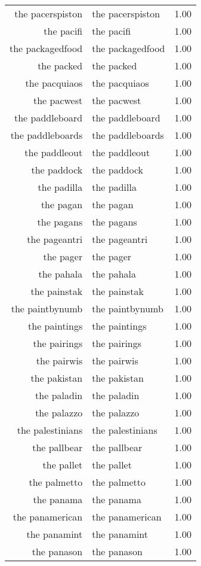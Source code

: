 \begin{table}[ht]
\begin{tabular}{rlr}
  the pacerspiston & the pacerspiston & 1.00 \\ 
  the pacifi & the pacifi & 1.00 \\ 
  the packagedfood & the packagedfood & 1.00 \\ 
  the packed & the packed & 1.00 \\ 
  the pacquiaos & the pacquiaos & 1.00 \\ 
  the pacwest & the pacwest & 1.00 \\ 
  the paddleboard & the paddleboard & 1.00 \\ 
  the paddleboards & the paddleboards & 1.00 \\ 
  the paddleout & the paddleout & 1.00 \\ 
  the paddock & the paddock & 1.00 \\ 
  the padilla & the padilla & 1.00 \\ 
  the pagan & the pagan & 1.00 \\ 
  the pagans & the pagans & 1.00 \\ 
  the pageantri & the pageantri & 1.00 \\ 
  the pager & the pager & 1.00 \\ 
  the pahala & the pahala & 1.00 \\ 
  the painstak & the painstak & 1.00 \\ 
  the paintbynumb & the paintbynumb & 1.00 \\ 
  the paintings & the paintings & 1.00 \\ 
  the pairings & the pairings & 1.00 \\ 
  the pairwis & the pairwis & 1.00 \\ 
  the pakistan & the pakistan & 1.00 \\ 
  the paladin & the paladin & 1.00 \\ 
  the palazzo & the palazzo & 1.00 \\ 
  the palestinians & the palestinians & 1.00 \\ 
  the pallbear & the pallbear & 1.00 \\ 
  the pallet & the pallet & 1.00 \\ 
  the palmetto & the palmetto & 1.00 \\ 
  the panama & the panama & 1.00 \\ 
  the panamerican & the panamerican & 1.00 \\ 
  the panamint & the panamint & 1.00 \\ 
  the panason & the panason & 1.00 \\ 

\end{tabular}
\end{table}
